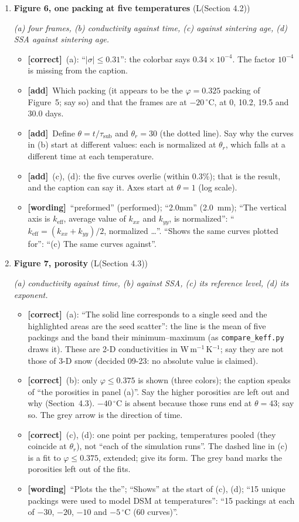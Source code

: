 \documentclass[11pt]{article}
\newcommand{\Pg}[3]{\item \textbf{#1} {\small(#2)}\par\textit{#3}}
\newcommand{\tC}{\textcolor{miss}{\textbf{[correct]}}\ }
\newcommand{\tG}{\textcolor{stale}{\textbf{[wording]}}\ }
\newcommand{\tA}{\textcolor{have}{\textbf{[add]}}\ }
\begin{document}
\begin{enumerate}
\begin{itemize}
  \end{itemize}
\Pg{Figure 6, one packing at five temperatures}{L(Section 4.2)}{(a) four frames, (b) conductivity against time, (c) against sintering age, (d) SSA against sintering age.}
  \begin{itemize}
  \item \tC (a): ``$|\sigma| \le 0.31$'': the colorbar says
    $0.34\times10^{-4}$. The factor $10^{-4}$ is missing from the caption.
  \item \tA Which packing (it appears to be the $\varphi = 0.325$ packing of
    Figure~5; say so) and that the frames are at $-20\,^{\circ}$C, at 0,
    10.2, 19.5 and 30.0 days.
  \item \tA Define $\theta = t/\tau_{\mathrm{sub}}$ and $\theta_r = 30$ (the
    dotted line). Say why the curves in (b) start at different values: each
    is normalized at $\theta_r$, which falls at a different time at each
    temperature.
  \item \tA (c), (d): the five curves overlie (within 0.3\%); that is the
    result, and the caption can say it. Axes start at $\theta = 1$
    (log scale).
  \item \tG ``preformed'' (performed); ``2.0mm'' (2.0~mm); ``The vertical
    axis is $k_{\mathrm{eff}}$, average value of $k_{xx}$ and $k_{yy}$, is
    normalized'': ``$k_{\mathrm{eff}} = (k_{xx}+k_{yy})/2$, normalized
    \ldots''. ``Shows the same curves plotted for'': ``(c) The same curves
    against''.
  \end{itemize}
\Pg{Figure 7, porosity}{L(Section 4.3)}{(a) conductivity against time, (b) against SSA, (c) its reference level, (d) its exponent.}
  \begin{itemize}
  \item \tC (a): ``The solid line corresponds to a single seed and the
    highlighted areas are the seed scatter'': the line is the mean of five
    packings and the band their minimum--maximum (as
    \texttt{compare\_keff.py} draws it).
    These are 2-D conductivities in W\,m$^{-1}$\,K$^{-1}$; say they are not
    those of 3-D snow (decided 09-23: no absolute value is claimed).
  \item \tC (b): only $\varphi \le 0.375$ is shown (three colors); the
    caption speaks of ``the porosities in panel (a)''. Say the higher
    porosities are left out and why (Section~4.3). $-40\,^{\circ}$C is
    absent because those runs end at $\theta = 43$; say so. The grey arrow
    is the direction of time.
  \item \tC (c), (d): one point per packing, temperatures pooled (they
    coincide at $\theta_r$), not ``each of the simulation runs''. The dashed
    line in (c) is a fit to $\varphi \le 0.375$, extended; give its form.
    The grey band marks the porosities left out of the fits.
  \item \tG ``Plots the the''; ``Shows'' at the start of (c), (d); ``15
    unique packings were used to model DSM at temperatures'': ``15 packings
    at each of $-30$, $-20$, $-10$ and $-5\,^{\circ}$C (60 curves)''.
  \end{itemize}
\end{enumerate}
\end{document}
